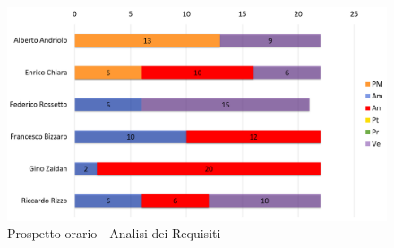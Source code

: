 \begin{figure}[H]
	\centering
	\includegraphics[width= 14cm]{immagini/ar_istogramma.png}
	\caption{Prospetto orario - Analisi dei Requisiti}
\end{figure}
\newpage

